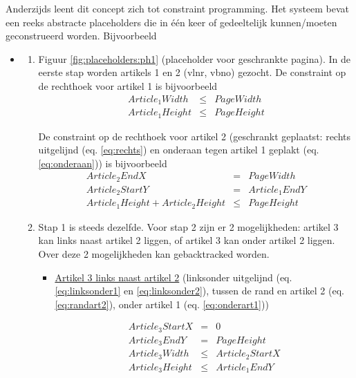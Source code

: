 \documentclass[a4paper,12pt]{report}
\begin{document}
Anderzijds leent dit concept zich tot constraint programming. Het systeem bevat een reeks abstracte placeholders die in één keer of gedeeltelijk kunnen/moeten geconstrueerd worden. Bijvoorbeeld
\begin{itemize}
	\item 
		\begin{enumerate}
			\item
	Figuur \ref{fig:placeholders:ph1} (placeholder voor geschrankte pagina). In de eerste stap worden artikels 1 en 2 (vlnr, vbno) gezocht. De constraint op de rechthoek voor artikel 1 is bijvoorbeeld 
		\begin{eqnarray*}
			Article_{1}Width &\leq& PageWidth \\
			Article_{1}Height &\leq& PageHeight \label{eq:onderaan}
		\end{eqnarray*} 

De constraint op de rechthoek voor artikel 2 (geschrankt geplaatst: rechts uitgelijnd (eq. \ref{eq:rechts}) en onderaan tegen artikel 1 geplakt (eq. \ref{eq:onderaan})) is bijvoorbeeld 
		\begin{eqnarray}
			Article_{2}EndX &=& PageWidth \label{eq:rechts} \\
			Article_{2}StartY &=& Article_{1}EndY \label{eq:onderaan} \\
			Article_{1}Height + Article_{2}Height &\leq& PageHeight \label{eq:niethoger}
		\end{eqnarray} 
			
			\item
	Stap 1 is steeds dezelfde. Voor stap 2 zijn er 2 mogelijkheden: artikel 3 kan links naast artikel 2 liggen, of artikel 3 kan onder artikel 2 liggen. Over deze 2 mogelijkheden kan gebacktracked worden.
	
	\begin{itemize}
		\item \underline{Artikel 3 links naast artikel 2} (linksonder uitgelijnd (eq. \ref{eq:linksonder1} en \ref{eq:linksonder2}), tussen de rand en artikel 2 (eq. \ref{eq:randart2}), onder artikel 1 (eq. \ref{eq:onderart1}))
		
			\begin{eqnarray}
				Article_{3}StartX &=& 0 	\label{eq:linksonder1} \\
				Article_{3}EndY &=& PageHeight \label{eq:linksonder2} \\
				Article_{3}Width &\leq& Article_{2}StartX \label{eq:randart2} \\
				Article_{3}Height &\leq& Article_{1}EndY \label{eq:onderart1}
			\end{eqnarray}


\end{itemize}
\end{enumerate}
\end{itemize}
\end{document}
